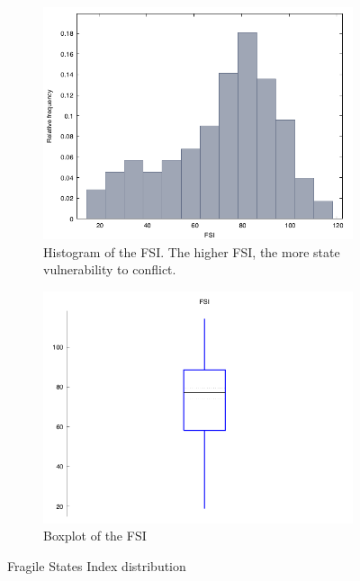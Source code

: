 \documentclass{article}
\begin{document}
\begin{figure}[h]
\begin{subfigure}{.5\textwidth}
  \centering
  \includegraphics[width=1.0\textwidth]{fsi_histogram}
    \caption{Histogram of the FSI. The higher FSI, the more state vulnerability to conflict.}
    \label{fig:fsi_hist}
\end{subfigure} 
\begin{subfigure}{.5\textwidth}
  \centering
  \includegraphics[width=1.0\textwidth]{fsi_boxplot}
    \caption{Boxplot of the FSI}
    \label{fig:fsi_box}
\end{subfigure}
\caption{Fragile States Index distribution}
\label{fig:fsi}
\end{figure}
\end{document}
